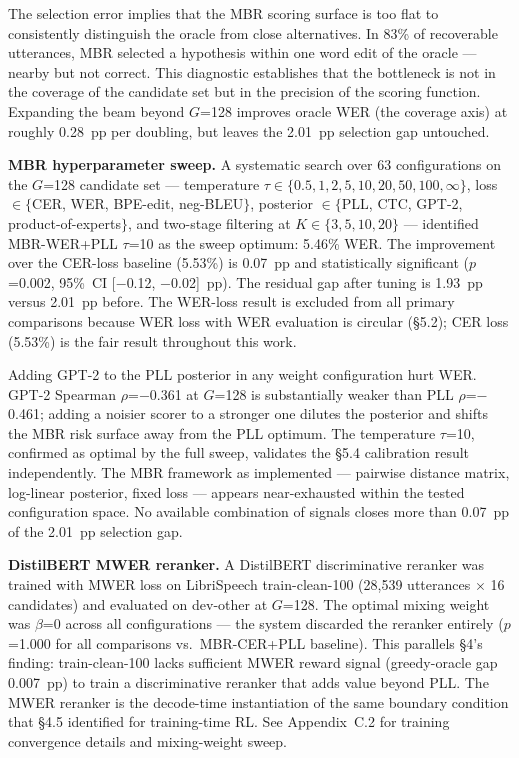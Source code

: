 The selection error implies that the MBR scoring surface is too flat to consistently distinguish
the oracle from close alternatives. In 83\% of recoverable utterances, MBR selected a hypothesis
within one word edit of the oracle — nearby but not correct. This diagnostic establishes that the
bottleneck is not in the coverage of the candidate set but in the precision of the scoring
function. Expanding the beam beyond $G$=128 improves oracle WER (the coverage axis) at
roughly 0.28~pp per doubling, but leaves the 2.01~pp selection gap untouched.

\textbf{MBR hyperparameter sweep.} A systematic search over 63 configurations on the $G$=128
candidate set — temperature $\tau \in \{0.5, 1, 2, 5, 10, 20, 50, 100, \infty\}$, loss
$\in \{$CER, WER, BPE-edit, neg-BLEU$\}$, posterior $\in \{$PLL, CTC, GPT-2, product-of-experts$\}$,
and two-stage filtering at $K \in \{3, 5, 10, 20\}$ — identified MBR-WER+PLL $\tau$=10 as the
sweep optimum: 5.46\% WER. The improvement over the CER-loss baseline
(5.53\%) is 0.07~pp and statistically significant ($p$=0.002, 95\%\ CI [$-$0.12,
$-$0.02]~pp). The residual gap after tuning is 1.93~pp versus 2.01~pp before. The WER-loss
result is excluded from all primary comparisons because WER loss with WER evaluation is
circular (§5.2); CER loss (5.53\%) is the fair result throughout this work.

Adding GPT-2 to the PLL posterior in any weight configuration hurt WER. GPT-2 Spearman
$\rho$=$-$0.361 at $G$=128 is substantially weaker than PLL $\rho$=$-$0.461; adding a noisier
scorer to a stronger one dilutes the posterior and shifts the MBR risk surface away from the PLL
optimum. The temperature $\tau$=10, confirmed as optimal by the full sweep, validates the
§5.4 calibration result independently. The MBR framework as implemented — pairwise distance
matrix, log-linear posterior, fixed loss — appears near-exhausted within the tested configuration space. No available combination of
signals closes more than 0.07~pp of the 2.01~pp selection gap.

\textbf{DistilBERT MWER reranker.} A DistilBERT discriminative reranker \cite{sanh2019distilbert} was trained with MWER loss on LibriSpeech train-clean-100 (28,539 utterances $\times$ 16 candidates) and evaluated on dev-other at $G$=128. The optimal mixing weight was $\beta$=0 across all configurations — the system discarded the reranker entirely ($p$=1.000 for all comparisons vs.\ MBR-CER+PLL baseline). This parallels §4's finding: train-clean-100 lacks sufficient MWER reward signal (greedy-oracle gap 0.007~pp) to train a discriminative reranker that adds value beyond PLL. The MWER reranker is the decode-time instantiation of the same boundary condition that §4.5 identified for training-time RL. See Appendix~C.2 for training convergence details and mixing-weight sweep.

